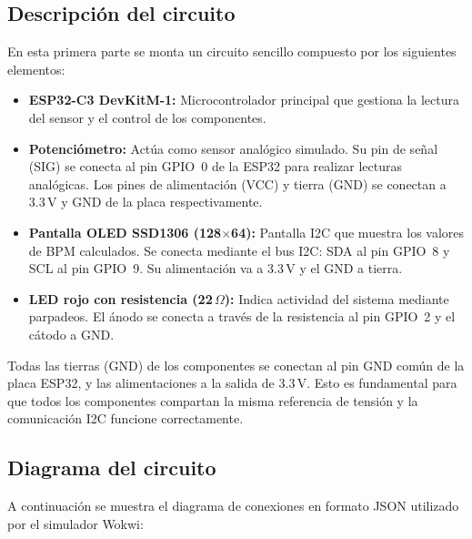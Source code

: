 \documentclass[11pt,a4paper]{article}
\begin{document}
\subsection{Descripción del circuito}

En esta primera parte se monta un circuito sencillo compuesto por los siguientes elementos:

\begin{itemize}
    \item \textbf{ESP32-C3 DevKitM-1:} Microcontrolador principal que gestiona la lectura del sensor y el control de los componentes.
    \item \textbf{Potenciómetro:} Actúa como sensor analógico simulado. Su pin de señal (SIG) se conecta al pin GPIO~0 de la ESP32 para realizar lecturas analógicas. Los pines de alimentación (VCC) y tierra (GND) se conectan a 3.3\,V y GND de la placa respectivamente.
    \item \textbf{Pantalla OLED SSD1306 (128$\times$64):} Pantalla I2C que muestra los valores de BPM calculados. Se conecta mediante el bus I2C: SDA al pin GPIO~8 y SCL al pin GPIO~9. Su alimentación va a 3.3\,V y el GND a tierra.
    \item \textbf{LED rojo con resistencia (22\,$\Omega$):} Indica actividad del sistema mediante parpadeos. El ánodo se conecta a través de la resistencia al pin GPIO~2 y el cátodo a GND.
\end{itemize}

Todas las tierras (GND) de los componentes se conectan al pin GND común de la placa ESP32, y las alimentaciones a la salida de 3.3\,V. Esto es fundamental para que todos los componentes compartan la misma referencia de tensión y la comunicación I2C funcione correctamente.

\subsection{Diagrama del circuito}

A continuación se muestra el diagrama de conexiones en formato JSON utilizado por el simulador Wokwi:
\end{document}
